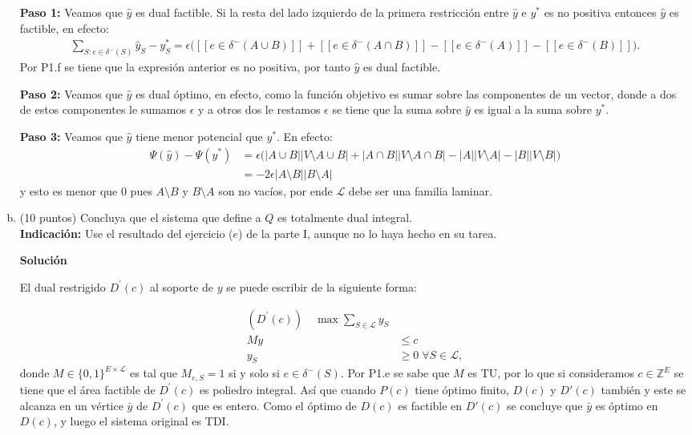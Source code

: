 \documentclass{article}
\newcommand{\IV}[1]{[\![#1]\!]} %
\theoremstyle{plain}
\theoremstyle{definition}
\theoremstyle{Azul}
\begin{document}
\begin{enumerate}[(a)]
\textbf{Paso 1:} Veamos que $\hat{y}$ es dual factible. Si la resta del lado izquierdo de la primera restricción entre  $\hat{y}$ e $y^{*}$ es no positiva entonces $\hat{y}$ es factible, en efecto:
\begin{align*}
\sum_{S:e\in\delta^{-}(S)}\hat{y}_{S}-y^{*}_{S} = \epsilon\bigg(\IV{e\in \delta^{-}(A\cup B)}+\IV{e\in \delta^{-}(A\cap B)}-\IV{e\in \delta^{-}(A)}-\IV{e\in \delta^{-}(B)}\bigg).
\end{align*}
Por P1.f se tiene que la expresión anterior es no positiva, por tanto $\hat{y}$ es dual factible.

\textbf{Paso 2:} Veamos que $\hat{y}$ es dual óptimo, en efecto, como la función objetivo es sumar sobre las componentes de un vector, donde a dos de estos componentes le sumamos $\epsilon$ y a otros dos le restamos $\epsilon$ se tiene que la suma sobre $\hat{y}$ es igual a la suma sobre $y^{*}$.


\textbf{Paso 3:} Veamos que $\hat{y}$ tiene menor potencial que $y^{*}$. En efecto: \begin{align*}
    \Psi(\hat{y})-\Psi(y^{*}) &= \epsilon\bigg(|A\cup B||V\setminus A\cup B|+|A\cap B||V\setminus A\cap B|-|A||V\setminus A|-|B||V\setminus B| \bigg) \\
    &=-2\epsilon|A\setminus B||B\setminus A|
\end{align*}
y esto es menor que $0$ pues $A\setminus B$ y $B\setminus A$ son no vacíos, por ende $\mathcal{L}$ debe ser una familia laminar.

\item (10 puntos) Concluya que el sistema que define a $Q$ es totalmente dual integral.\\
\textbf{Indicación:} Use el resultado del ejercicio ($e$) de la parte I, aunque no lo haya hecho en su tarea.

\textbf{Solución}

El dual restrigido $D^{'}(c)$ al soporte de $y$ se puede escribir de la siguiente forma:

\begin{align*}
	(D^{'}(c))\quad \max \sum_{S\in \mathcal{L}}y_{S}\\
    My&\leq c\\
	y_{S}&\geq 0 \;\forall S\in \mathcal{L},
\end{align*}
donde $M\in\{0,1\}^{E\times \mathcal{L}}$ es tal que $M_{e, S} = 1$ si y solo si $e\in \delta^{-}(S)$. Por P1.e se sabe que $M$ es TU, por lo que si consideramos $c\in \mathbb{Z}^{E}$ se tiene que el área factible de $D^{'}(c)$ es poliedro integral. Así que cuando $P(c)$ tiene óptimo finito, $D(c)$ y $D'(c)$ también y este se alcanza en un vértice $\bar{y}$ de $D^{'}(c)$ que es entero. Como el óptimo de $D(c)$ es factible en $D'(c)$ se concluye que $\bar{y}$ es óptimo en $D(c)$, y luego el sistema original es TDI.

\end{enumerate}
\end{document}
